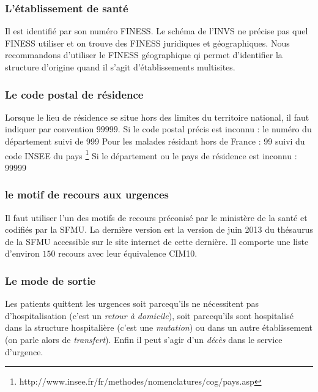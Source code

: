 \documentclass[12pt,english,french,twoside]{report}\usepackage[]{graphicx}\usepackage[]{color}
\begin{document}
\subsubsection{L'établissement de santé}

Il est identifié par son numéro FINESS. Le schéma de l'INVS ne précise pas quel FINESS utiliser et on trouve des FINESS juridiques et géographiques. Nous recommandons d'utiliser le FINESS géographique qi permet d'identifier la structure d'origine quand il s'agit d'établissements multisites.

\subsubsection{Le code postal de résidence}

Lorsque le lieu de résidence se situe hors des limites du territoire national, il faut indiquer par convention $99999$.
Si le code postal précis est inconnu : le numéro du département suivi de 999
Pour les malades résidant hors de France : 99 suivi du code INSEE du pays \footnote{http://www.insee.fr/fr/methodes/nomenclatures/cog/pays.asp}
Si le département ou le pays de résidence est inconnu : 99999

\subsubsection{le motif de recours aux urgences}

Il faut utiliser l'un des motifs de recours préconisé par le ministère de la santé \cite{13} et codifiés par la SFMU. La dernière version est la version de juin 2013 du thésaurus de la SFMU accessible sur le site internet de cette dernière. Il comporte une liste d'environ $150$ recours avec leur équivalence CIM10.

\subsubsection{Le mode de sortie}

\label{ref:sortie}
Les patients quittent les urgences soit parcequ'ils ne nécessitent pas d'hospitalisation (c'est un \emph{retour à domicile}), soit parcequ'ils sont hospitalisé dans la structure hospitalière (c'est une \emph{mutation}) ou dans un autre établissement (on parle alors de \emph{transfert}). Enfin il peut s'agir d'un \emph{décès} dans le service d'urgence.
\end{document}
